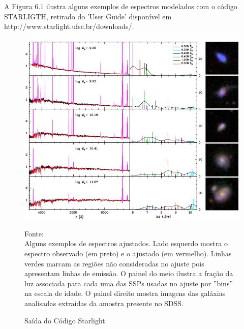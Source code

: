 A Figura 6.1 ilustra alguns exemplos de espectros modelados com o código STARLIGTH, retirado do 'User Guide' disponível em http://www.starlight.ufsc.br/downloads/.

\begin{figure}[H]
	\centering	
    \caption{Saída do Código Starlight}
    \includegraphics[width=1.0\textwidth]{figuras/starlight-ex.jpg}
   	\begin{center}
        \normalsize Fonte: \vskip 0.5cm \\Alguns exemplos de espectros ajustados. Lado esquerdo mostra o espectro observado (em preto) e o ajustado (em vermelho). Linhas verdes
marcam as regiões não consideradas no ajuste pois apresentam linhas de emissão. O painel do meio ilustra a fração da luz associada para cada uma das SSPs usadas no ajuste por ”bins” na escala de idade. O painel direito mostra imagens das galáxias analisadas extraídas da amostra presente no SDSS. 
    \end{center}
	\label{fig:sbmt-moses}
\end{figure}